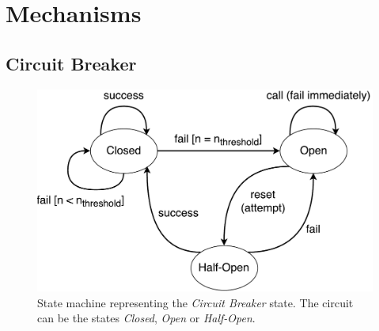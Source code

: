 \section{Mechanisms}

\subsection{Circuit Breaker}

\begin{figure}[H]
\centering
\includegraphics[width=\textwidth]{../media/CircuitBreakerState.pdf} 
\caption{State machine representing the \textit{Circuit Breaker} state. The
	circuit can be the states \textit{Closed}, \textit{Open} or 
	\textit{Half-Open}.}
\label{fig:circuitbreakerstate}
\end{figure}
 
 
